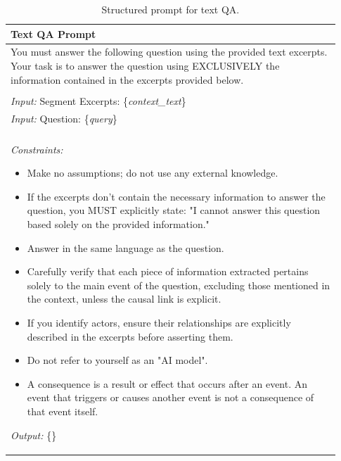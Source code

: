 \documentclass[11pt]{article}
\begin{document}
\begin{table}[t]
    \centering
    \footnotesize
    \caption{Structured prompt for text QA.}
    \label{tab:prompt_historical_qa}
    {\ttfamily %
    \begin{tabular}{p{0.93\linewidth}}
        \hline
        \textbf{Text QA Prompt} \\
        \hline
        You must answer the following question using the provided text excerpts. Your task is to answer the question using EXCLUSIVELY the information contained in the excerpts provided below.\\
        \\
        \textit{Input:} Segment Excerpts: \{\textit{context\_text}\} \\
        \textit{Input:} Question: \{\textit{query}\} \\
        \\
        \textit{Constraints:}
        \begin{itemize}[leftmargin=*,noitemsep,topsep=2pt]
            \item Make no assumptions; do not use any external knowledge.
            \item If the excerpts don't contain the necessary information to answer the question, you MUST explicitly state: "I cannot answer this question based solely on the provided information."
            \item Answer in the same language as the question.
            \item Carefully verify that each piece of information extracted pertains solely to the main event of the question, excluding those mentioned in the context, unless the causal link is explicit.
            \item If you identify actors, ensure their relationships are explicitly described in the excerpts before asserting them.
            \item Do not refer to yourself as an "AI model".
            \item A consequence is a result or effect that occurs after an event. An event that triggers or causes another event is not a consequence of that event itself.
        \end{itemize}
        \textit{Output:} \{\}\\
        \hline
    \end{tabular}
    }
\end{table}

\clearpage
\end{document}
